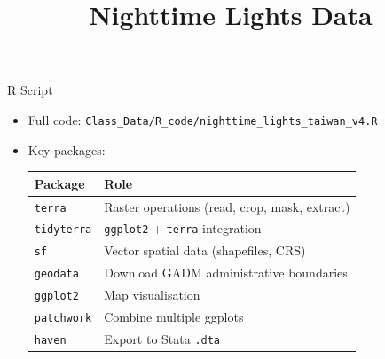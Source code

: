 \documentclass[dvipsnames,hyperref={pdfpagelabels=false}]{beamer}
\begin{document}
\begin{frame}{R Script}
\begin{itemize}
  \item Full code: \texttt{Class\_Data/R\_code/nighttime\_lights\_taiwan\_v4.R}
  \vspace{0.3cm}
  \item Key packages:
  \vspace{0.1cm}
  \begin{center}
  \small
  \begin{tabular}{ll}
    \toprule
    \textbf{Package}    & \textbf{Role} \\
    \midrule
    \texttt{terra}      & Raster operations (read, crop, mask, extract) \\
    \texttt{tidyterra}  & \texttt{ggplot2} + \texttt{terra} integration \\
    \texttt{sf}         & Vector spatial data (shapefiles, CRS) \\
    \texttt{geodata}    & Download GADM administrative boundaries \\
    \texttt{ggplot2}    & Map visualisation \\
    \texttt{patchwork}  & Combine multiple ggplots \\
    \texttt{haven}      & Export to Stata \texttt{.dta} \\
    \bottomrule
  \end{tabular}
  \end{center}
\end{itemize}
\end{frame}


\title[]{Nighttime Lights Data}
\author{}
\institute{}
\date{}
\begin{frame}{}
  \titlepage
\end{frame}
\end{document}
